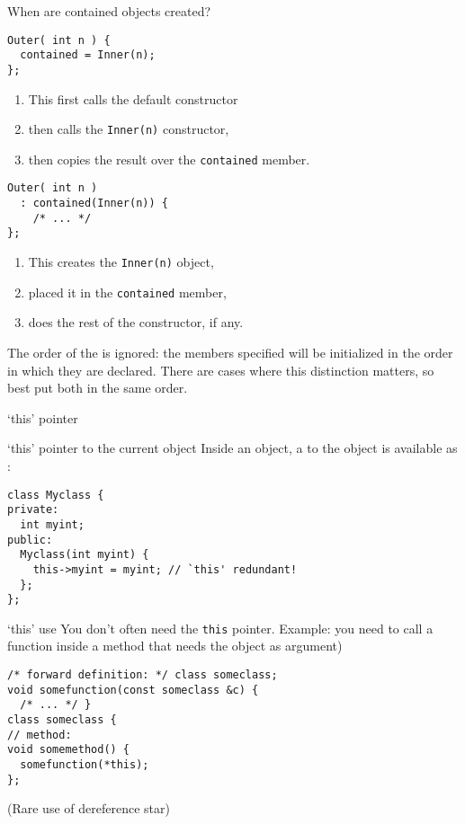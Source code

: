 \begin{block}{When are contained objects created?}
  \label{sl:construct-contained2}
\begin{multicols}{2}
\begin{lstlisting}
Outer( int n ) {
  contained = Inner(n);
};
\end{lstlisting}
  \begin{enumerate}
  \item This first calls the default constructor
  \item then calls the \lstinline+Inner(n)+ constructor,
  \item then copies the result over the \lstinline+contained+ member.
  \end{enumerate}
\columnbreak
\begin{lstlisting}
Outer( int n ) 
  : contained(Inner(n)) {
    /* ... */
};
\end{lstlisting}
\begin{enumerate}
\item This creates the \lstinline+Inner(n)+ object,
\item placed it in the \lstinline+contained+ member,
\item does the rest of the constructor, if any.
\end{enumerate}
\end{multicols}
\end{block}

\begin{remark}
  The order of the  is ignored: the members
  specified will be initialized in the order in which they are declared.
  There are cases where this distinction matters, so best put both in the same order.
\end{remark}

 {`this' pointer}

\begin{block}{`this' pointer to the current object}
  \label{sl:class-this}
  Inside an object, a  to the object is available
  as :
\begin{lstlisting}
class Myclass {
private:
  int myint;
public:
  Myclass(int myint) {
    this->myint = myint; // `this' redundant!
  };
};
\end{lstlisting}
\end{block}

\begin{block}{`this' use}
  \label{sl:class-this-fun}
You don't often need the \lstinline{this} pointer. Example:
you need to call a function inside a method that needs the object as argument)
\begin{lstlisting}
/* forward definition: */ class someclass;
void somefunction(const someclass &c) {
  /* ... */ }
class someclass {
// method:
void somemethod() {
  somefunction(*this);
};
\end{lstlisting}
(Rare use of dereference star)
\end{block}

